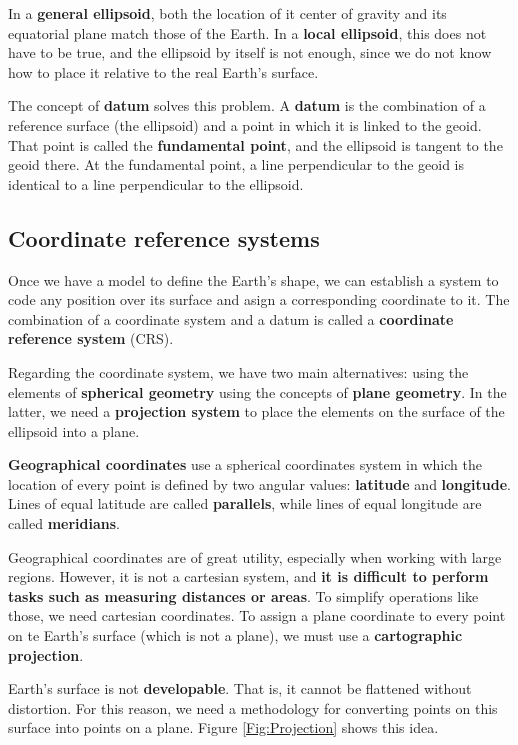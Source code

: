 In a \textbf{general ellipsoid}, both the location of it center of gravity and its equatorial plane match those of the Earth. In a \textbf{local ellipsoid}, this does not have to be true, and the ellipsoid by itself is not enough, since we do not know how to place it relative to the real Earth's surface.

The concept of \textbf{datum} solves this problem. A \textbf{datum} is the combination of a reference surface (the ellipsoid) and a point in which it is linked to the geoid. That point is called the \textbf{fundamental point}, and the ellipsoid is tangent to the geoid there. At the fundamental point, a line perpendicular to the geoid is identical to a line perpendicular to the ellipsoid. 

\subsection{Coordinate reference systems}

Once we have a model to define the Earth's shape, we can establish a system to code any position over its surface and asign a corresponding coordinate to it. The combination of a coordinate system and a datum is called a \textbf{coordinate reference system} (CRS).

Regarding the coordinate system, we have two main alternatives: using the elements of \textbf{spherical geometry} using the concepts of \textbf{plane geometry}. In the latter, we need a \textbf{projection system} to place the elements on the surface of the ellipsoid into a plane.

\textbf{Geographical coordinates} use a spherical coordinates system in which the location of every point is defined by two angular values: \textbf{latitude} and \textbf{longitude}. Lines of equal latitude are called \textbf{parallels}, while lines of equal longitude are called \textbf{meridians}.

Geographical coordinates are of great utility, especially when working with large regions. However, it is not a cartesian system, and \textbf{it is difficult to perform tasks such as measuring distances or areas}. To simplify operations like those, we need cartesian coordinates. To assign a plane coordinate to every point on te Earth's surface (which is not a plane), we must use a \textbf{cartographic projection}.

Earth's surface is not \textbf{developable}. That is, it cannot be flattened without distortion. For this reason, we need a methodology for converting points on this surface into points on a plane. Figure \ref{Fig:Projection} shows this idea.

